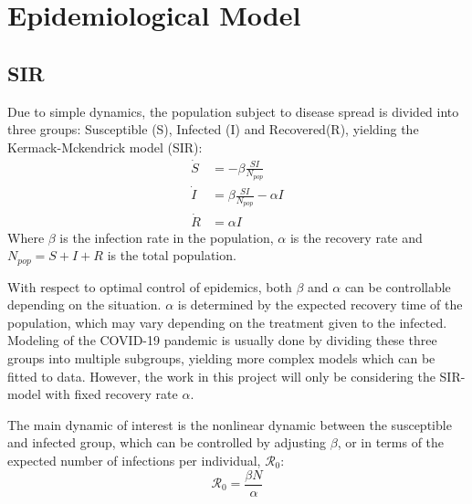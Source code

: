 \section{Epidemiological Model}
\subsection{SIR}
Due to simple dynamics, the population subject to disease spread is divided into three groups: Susceptible (S), Infected (I) and Recovered(R), yielding the Kermack-Mckendrick model (SIR):
\begin{align}
    \dot{S} &= -\beta \frac{ S I}{N_{pop}}\nonumber\\
    \dot{I} &= \beta \frac{S I}{N_{pop}} - \alpha I\\
    \dot{R} &= \alpha I\nonumber
\end{align}
Where $\beta$ is the infection rate in the population, $\alpha$ is the recovery rate and $N_{pop} = S + I + R$ is the total population.

With respect to optimal control of epidemics, both $\beta$ and $\alpha$ can be controllable depending on the situation. $\alpha$ is determined by the expected recovery time of the population, which  may vary depending on the treatment given to the infected. Modeling of the COVID-19 pandemic is usually done by dividing these three groups into multiple subgroups, yielding more complex models which can be fitted to data. However, the work in this project will only be considering the SIR-model with fixed recovery rate $\alpha$.

The main dynamic of interest is the nonlinear dynamic between the susceptible and infected group, which can be controlled by adjusting $\beta$, or in terms of the expected number of infections per individual, $\mathscr{R}_0$:
\begin{equation}
    \mathscr{R}_0 = \frac{\beta N}{\alpha}
\end{equation}

